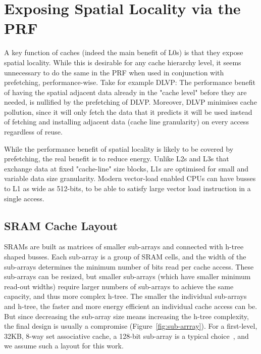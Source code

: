 \documentclass{sig-alternate}
\begin{document}
\section{Exposing Spatial Locality via the PRF}
A key function of caches (indeed the main benefit of L0s) is that they expose spatial locality. While this is desirable for any cache hierarchy level, it seems unnecessary to do the same in the PRF when used in conjunction with prefetching, performance-wise. %
Take for example DLVP: The performance benefit of having the spatial adjacent data already in the "cache level" before they are needed, is nullified by the prefetching of DLVP. Moreover, DLVP minimises cache pollution, since it will only fetch the data that it predicts it will be used instead of fetching and installing adjacent data (cache line granularity) on every access regardless of reuse.

While the performance benefit of spatial locality is likely to be covered by prefetching, the real benefit is to reduce energy. Unlike L2s and L3s that exchange data at fixed "cache-line" size blocks, L1s are optimised for small and variable data size granularity. Modern vector-load enabled CPUs can have busses to L1 as wide as 512-bits, to be able to satisfy large vector load instruction in a single access. %


\subsection{SRAM Cache Layout}

SRAMs are built as matrices of smaller sub-arrays and connected with h-tree shaped busses. Each sub-array is a group of SRAM cells, and the width of the sub-arrays determines the minimum number of bits read per cache access. These sub-arrays can be resized, but smaller sub-arrays (which have smaller minimum read-out widths) require larger numbers of sub-arrays to achieve the same capacity, and thus more complex h-tree. The smaller the individual sub-arrays and h-tree, the faster and more energy efficient an individual cache access can be. But since decreasing the sub-array size means increasing the h-tree complexity, the final design is usually a compromise (Figure~\ref{fig:sub-arrray}). For a first-level, 32KB, 8-way set associative cache, a 128-bit sub-array is a typical choice~\cite{SBAC-PAD/2017addressing, cacti-p11}, and we assume such a layout for this work.
\end{document}
